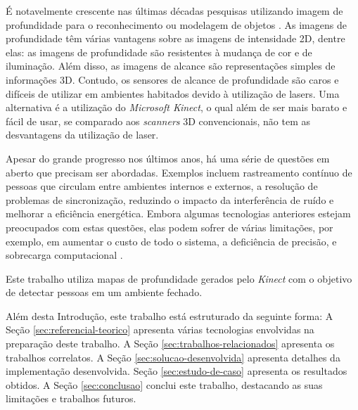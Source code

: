 É notavelmente crescente nas últimas décadas pesquisas utilizando imagem de profundidade para o reconhecimento ou modelagem de objetos \cite{sabata1993, vemuri1986}. As imagens de profundidade têm várias vantagens sobre as imagens de intensidade 2D, dentre elas: as imagens de profundidade são resistentes à mudança de cor e de iluminação. Além disso, as imagens de alcance são representações simples de informações 3D. Contudo, os sensores de alcance de profundidade são caros e difíceis de utilizar em ambientes habitados devido à utilização de lasers. Uma alternativa é a utilização do \textit{Microsoft Kinect}, o qual além de ser mais barato e fácil de usar, se comparado aos \textit{scanners} 3D convencionais, não tem as desvantagens da utilização de laser\cite{xia2011human}.

Apesar do grande progresso nos últimos anos, há uma série de questões em aberto que precisam ser abordadas. Exemplos incluem rastreamento contínuo de pessoas que circulam entre ambientes internos e externos, a resolução de problemas de sincronização, reduzindo o impacto da interferência de ruído e melhorar a eficiência energética. Embora algumas tecnologias anteriores estejam preocupados com estas questões, elas podem sofrer de várias limitações, por exemplo, em aumentar o custo de todo o sistema, a deficiência de precisão, e sobrecarga computacional \cite{zhang2010localization}.

Este trabalho utiliza mapas de profundidade gerados pelo \textit{Kinect} com o objetivo de detectar pessoas em um ambiente fechado.

Além desta Introdução, este trabalho está estruturado da seguinte forma:
A Seção \ref{sec:referencial-teorico} apresenta várias tecnologias envolvidas na preparação deste trabalho. A Seção \ref{sec:trabalhos-relacionados} apresenta os trabalhos correlatos. A Seção \ref{sec:solucao-desenvolvida} apresenta detalhes da implementação desenvolvida. Seção \ref{sec:estudo-de-caso} apresenta os resultados obtidos. A Seção \ref{sec:conclusao} conclui este trabalho, destacando as suas limitações e trabalhos futuros.